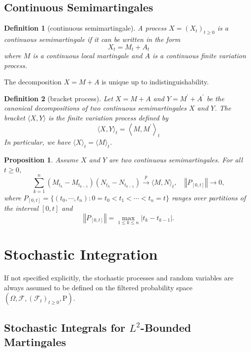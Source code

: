 \documentclass{report}
\newtheorem{definition}{Definition}[section]
\newtheorem{proposition}{Proposition}[section]
\theoremstyle{nonumberplain}
\begin{document}
\section{Continuous Semimartingales}
\begin{definition}[continuous semimartingale]
A process $X=\left(X_{t}\right)_{t \geq 0}$ is a continuous semimartingale if it can be written in the form
\[
X_{t}=M_{t}+A_{t}
\]
where $M$ is a continuous local martingale and $A$ is a continuous finite variation process.
\end{definition}
The decomposition $X=M+A$ is unique up to indistinguishability.

\begin{definition}[bracket process]
Let $X=M+A$ and $Y=M^{\prime}+A^{\prime}$ be the canonical decompositions of two continuous semimartingales $X$ and $Y$. The bracket $\langle X, Y\rangle$ is the finite variation process defined by
\[
\langle X, Y\rangle_{t}=\left\langle M, M^{\prime}\right\rangle_{t}
\]
In particular, we have $\langle X\rangle_{t}=\langle M\rangle_{t}$.
\end{definition}

\begin{proposition}
	Assume $X$ and $Y$ are two continuous semimartingales. For all $t\ge0$,
	\[
	\sum_{k=1}^{n}\left(M_{t_{k}}-M_{t_{k-1}}\right)\left(N_{t_{k}}-N_{t_{k-1}}\right)\stackrel{p}{\longrightarrow}\langle M, N\rangle_{t},\quad\left\Vert P_{[0,t]}\right\Vert \longrightarrow 0,
	\]
	where $P_{[0,t]}=\{(t_0,\cdots,t_n):0=t_0<t_1<\cdots<t_n=t\}$ ranges over partitions of the interval $[0,t]$ and 
	\[
	\left\Vert P_{[0,t]}\right\Vert=\max\limits_{1\le k\le n}{|t_k-t_{k-1}|}.
	\]
\end{proposition}

\chapter{Stochastic Integration}
If not specified explicitly, the stochastic processes and random variables are always assumed to be defined on the filtered probability space $(\Omega,\mathcal{F},(\mathcal{F}_{t})_{t\ge0},\mathrm{P})$.
\section{Stochastic Integrals for $L^2$-Bounded Martingales}
\end{document}
